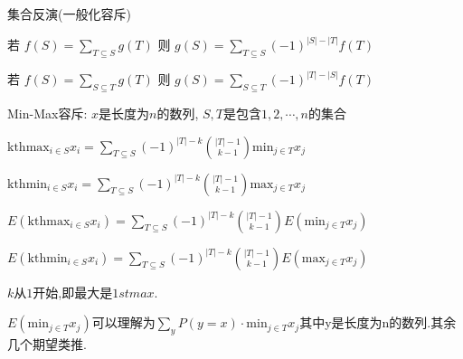 集合反演(一般化容斥)

若 $f(S) = \sum_{T\subseteq S}g(T)$
则 $g(S) = \sum_{T\subseteq S}(-1)^{|S|-|T|}f(T)$

若 $f(S) = \sum_{S\subseteq T}g(T)$
则 $g(S) = \sum_{S\subseteq T}(-1)^{|T|-|S|}f(T)$

Min-Max容斥:
$x$是长度为$n$的数列, $S,T$是包含$1, 2, \cdots, n$的集合

$\mathrm{kthmax}_{i\in S}x_i=\sum_{T\subseteq S}(-1)^{|T|-k}\binom{|T|-1}{k-1}\mathrm{min}_{j\in T}x_j$

$\mathrm{kthmin}_{i\in S}x_i=\sum_{T\subseteq S}(-1)^{|T|-k}\binom{|T|-1}{k-1}\mathrm{max}_{j\in T}x_j$

$E(\mathrm{kthmax}_{i\in S}x_i)=\sum_{T\subseteq S}(-1)^{|T|-k}\binom{|T|-1}{k-1}E(\mathrm{min}_{j\in T}x_j)$

$E(\mathrm{kthmin}_{i\in S}x_i)=\sum_{T\subseteq S}(-1)^{|T|-k}\binom{|T|-1}{k-1}E(\mathrm{max}_{j\in T}x_j)$

$k$从$1$开始,即最大是$1stmax$.

$E(\mathrm{min}_{j\in T}x_j)$可以理解为$\sum_{y}P(y=x)\cdot \mathrm{min}_{j\in T}x_j$其中y是长度为n的数列.其余几个期望类推.